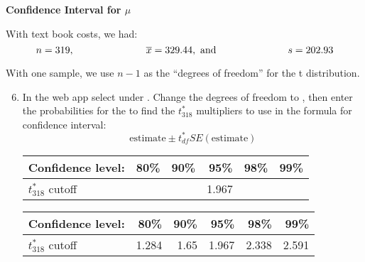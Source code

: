 \begin{center}
  {\large\bf Confidence Interval for $\mu$}
\end{center}

With text book costs, we had:
$$ n = 319, \mbox{\hspace{1in}} \overline{x} = 329.44, \mbox{ and\hspace{1in}}  s = 202.93 $$

With one sample, we use $n-1$ as the ``degrees of freedom'' for the t
distribution.  
\begin{enumerate}
  \setcounter{enumi}{5}
\item In the web app
  \webAppURLFrst select
   under . Change the degrees of
  freedom to , then enter the probabilities for the
   to find the $t^*_{318}$ multipliers to use in the
  formula for confidence interval:
     $$  \mbox{estimate} \pm t^*_{df} SE(\mbox{estimate}) $$
\begin{students}
   \begin{tabular}{l|rrrrr}
    Confidence level: &  \hspace{1cm}80\% &  \hspace{1cm}90\% &  \hspace{1cm}95\% & \hspace{1cm} 98\% & \hspace{1cm} 99\% \\ \hline
    $t_{318}^*$ cutoff  &  &  & 1.967 &  & 
  \end{tabular}\vspace{.2cm}
\end{students}
\begin{key}
   \begin{tabular}{l|rrrrr}
    Confidence level: &  \hspace{1cm}80\% &  \hspace{1cm}90\% &  \hspace{1cm}95\% & \hspace{1cm} 98\% & \hspace{1cm} 99\% \\ \hline
    $t_{318}^*$ cutoff  &1.284  &1.65  & 1.967 &2.338& 2.591
  \end{tabular}\vspace{.2cm}
\end{key}


\end{enumerate}
